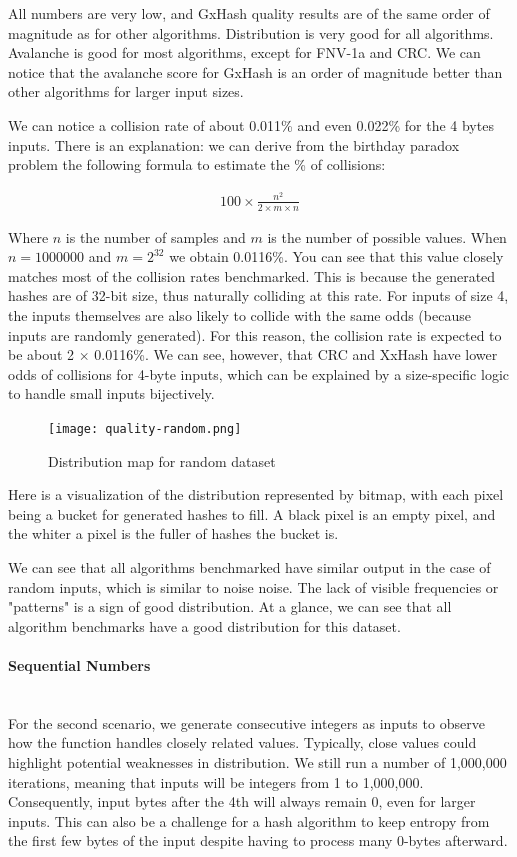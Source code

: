 \documentclass[10pt]{article}
\begin{document}
All numbers are very low, and GxHash quality results are of the same order of magnitude as for other algorithms. Distribution is very good for all algorithms. Avalanche is good for most algorithms, except for FNV-1a and CRC. We can notice that the avalanche score for GxHash is an order of magnitude better than other algorithms for larger input sizes.

We can notice a collision rate of about 0.011\% and even 0.022\% for the 4 bytes inputs. There is an explanation: we can derive from the birthday paradox problem the following formula to estimate the \% of collisions:

\begin{align*}
    100 \times \frac{n^2}{2 \times m \times n}
\end{align*}

Where \(n\) is the number of samples and \(m\) is the number of possible values. When \(n=1000000\) and \(m=2^{32}\) we obtain 0.0116\%.
You can see that this value closely matches most of the collision rates benchmarked. This is because the generated hashes are of 32-bit size,
thus naturally colliding at this rate. For inputs of size 4, the inputs themselves are also likely to collide with the same odds (because inputs are randomly generated). For this reason, the collision rate is expected to be about 2 \(\times\) 0.0116\%.
We can see, however, that CRC and XxHash\cite{xxhash} have lower odds of collisions for 4-byte inputs, which can be explained by a size-specific logic to handle small inputs bijectively.

\begin{figure}[H]
\centering
\texttt{[image: quality-random.png]}
\caption{Distribution map for random dataset}
\label{fig:quality-random}
\end{figure}

Here is a visualization of the distribution represented by bitmap, with each pixel being a bucket for generated hashes to fill. A black pixel is an empty pixel, and the whiter a pixel is the fuller of hashes the bucket is. 

We can see that all algorithms benchmarked have similar output in the case of random inputs, which is similar to noise noise. The lack of visible frequencies or "patterns" is a sign of good distribution. At a glance, we can see that all algorithm benchmarks have a good distribution for this dataset.

\clearpage
\paragraph{Sequential Numbers}\leavevmode\\
For the second scenario, we generate consecutive integers as inputs to observe how the function handles closely related values. Typically, close values could highlight potential weaknesses in distribution. We still run a number of 1,000,000 iterations, meaning that inputs will be integers from 1 to 1,000,000. Consequently, input bytes after the 4th will always remain 0, even for larger inputs. This can also be a challenge for a hash algorithm to keep entropy from the first few bytes of the input despite having to process many 0-bytes afterward.
\end{document}
